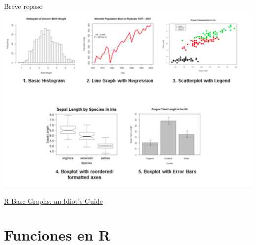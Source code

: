 \documentclass[
  ignorenonframetext,
]{beamer}
\begin{document}
\begin{frame}{Breve repaso}
\protect\hypertarget{breve-repaso-3}{}
\includegraphics{../../imgs/r_base_graphs.png}

\href{https://rpubs.com/SusanEJohnston/7953}{R Base Graphs: an Idiot's
Guide}
\end{frame}

\hypertarget{funciones-en-r}{%
\section{Funciones en R}\label{funciones-en-r}}
\end{document}
